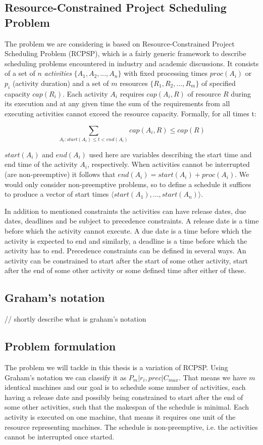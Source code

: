 \documentclass{article}
\theoremstyle{definition}
\begin{document}
\subsection{Resource-Constrained Project Scheduling Problem}
The problem we are considering is based on Resource-Constrained Project Scheduling Problem (RCPSP), which is a fairly generic framework to describe scheduling problems encountered in industry and academic discussions. It consists of a set of $n$ \textit{activities} $\{A_1, A_2, ..., A_n\}$ with fixed processing times $proc(A_i)$ or $p_i$ (activity duration) and a set of $m$ resources $\{R_1, R_2, ..., R_m\}$ of specified capacity $cap(R_i)$. Each activity $A_i$ requires $cap(A_i, R)$ of resource $R$ during its execution and at any given time the sum of the requirements from all executing activities cannot exceed the resource capacity. Formally, for all times t:

$$
\sum_{A_i : start(A_i) \leq t < end(A_i)} cap(A_i, R) \leq cap(R)
$$

$start(A_i)$ and $end(A_i)$ used here are variables describing the start time and end time of the activity $A_i$, respectively. When activities cannot be interrupted (are non-preemptive) it follows that $end(A_i) = start(A_i) + proc(A_i)$. We would only consider non-preemptive problems, so to define a schedule it suffices to produce a vector of start times $\langle start(A_1), ..., start(A_n)\rangle$.

In addition to mentioned constraints the activities can have release dates, due dates, deadlines and be subject to precedence constraints. A release date is a time before which the activity cannot execute. A due date is a time before which the activity is expected to end and similarly, a deadline is a time before which the activity has to end. Precedence constraints can be defined in several ways. An activity can be constrained to start after the start of some other activity, start after the end of some other activity or some defined time after either of these.


\subsection{Graham's notation}
// shortly describe what is graham's notation

\subsection{Problem formulation}
The problem we will tackle in this thesis is a variation of RCPSP. Using Graham's notation we can classify it as $P_m | r_i, prec | C_{max}$. That means we have $m$ identical machines and our goal is to schedule some number of activities, each having a release date and possibly being constrained to start after the end of some other activities, such that the makespan of the schedule is minimal. Each activity is executed on one machine, that means it requires one unit of the resource representing machines. The schedule is non-preemptive, i.e. the activities cannot be interrupted once started.
\end{document}
